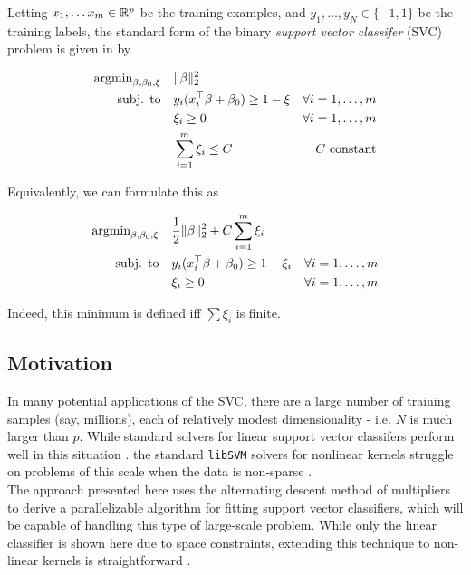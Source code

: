 \documentclass[11pt]{article}
\begin{document}
Letting $x_1, \ldots x_m \in \mathbb{R}^p$ be the training examples, and $y_1, \ldots, y_N \in \{-1,1\}$ be the training labels, 
the standard form of the binary \emph{support vector classifer} (SVC) problem is given in   \cite{hastie2009elements} by

\begin{equation} \label{first_form}
\begin{aligned}
    \operatorname{argmin}_{\beta, \beta_0, \xi}  \quad 
    & \|\beta\|^2_2 & \\
    \textrm{subj. to} \quad 
    & y_i (x_i^\top \beta + \beta_0) \geq 1 - \xi & \forall i = 1, \ldots, m \\
    & \xi_i \geq 0  & \forall i = 1, \ldots, m \\
    & \sum_{i=1}^m \xi_i \leq C & C \textrm{ constant}
\end{aligned}
\end{equation}

Equivalently, we can formulate this as 

\begin{equation} \label{second_form}
\begin{aligned}
    \operatorname{argmin}_{\beta, \beta_0, \xi} \quad 
    & \frac{1}{2} \| \beta  \|_2^2 +  C \sum_{i=1}^m \xi_i & \\ 
    \textrm{subj. to}  \quad 
    & y_i (x_i^\top \beta + \beta_0) \geq 1 - \xi_i & \forall i = 1, \ldots, m \\
    & \xi_i \geq 0  & \forall i = 1, \ldots, m
\end{aligned}
\end{equation}

Indeed, this minimum is defined iff $\sum \xi_i$ is finite. 


\subsection{Motivation}

In many potential applications of the SVC, there are a large number of training samples (say, millions), 
each of relatively modest dimensionality - i.e. $N$ is much larger than $p$.
While standard solvers for linear support vector classifers perform well in this situation 
\cite{fan2008liblinear}.
the standard \texttt{libSVM} solvers for nonlinear kernels struggle on problems of this 
scale when the data is non-sparse \cite{chang2011libsvm}. \\

The approach presented here uses the alternating descent method of multipliers to derive 
a parallelizable algorithm for fitting support vector classifiers, which will be capable 
of handling this type of large-scale problem.
While only the linear classifier is shown here due to space constraints, 
extending this technique to non-linear kernels is straightforward \cite{forero2010consensus}.
\end{document}
